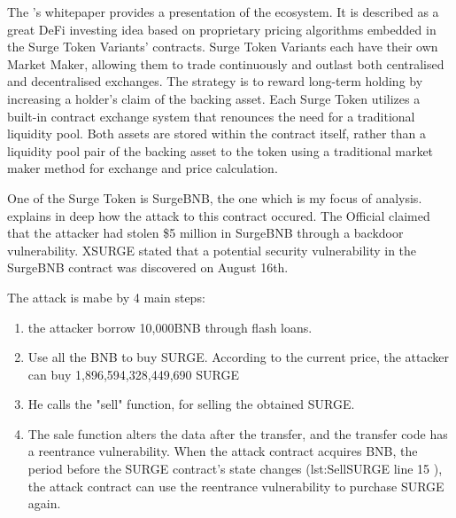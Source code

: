 The \citet{XSurgeWeb}'s whitepaper provides a presentation of the ecosystem.
It is described as a great DeFi investing idea based on proprietary pricing algorithms embedded in the Surge Token Variants' contracts.
Surge Token Variants each have their own Market Maker, allowing them to trade continuously and outlast both 
centralised and decentralised exchanges. 
The strategy is to reward long-term holding by increasing a
holder's claim of the backing asset. Each Surge Token utilizes a built-in contract exchange system that renounces the need for
a traditional liquidity pool. Both assets are stored within the contract itself, 
rather than a liquidity pool pair of the backing asset to the
token using a traditional market maker method for exchange and price calculation.

One of the Surge Token is SurgeBNB, the one which is my focus of analysis.
\citet{XSurgeBNB} explains in deep how the attack to this contract occured. 
The Official claimed that the attacker had stolen \$5 million in SurgeBNB through a backdoor vulnerability.
XSURGE stated that a potential security vulnerability in the SurgeBNB contract was discovered on August 16th.

The attack is mabe by 4 main steps:
\begin{enumerate}
    \item the attacker borrow  10,000BNB through flash loans.
    \item Use all the BNB to buy SURGE. According to the current price, 
    the attacker can buy 1,896,594,328,449,690 SURGE
    \item He calls the "sell" function, for selling the obtained SURGE.
    \item The sale function alters the data after the transfer, and the transfer code has a reentrance vulnerability.
    When the attack contract acquires BNB, the period before the SURGE contract's state changes 
    (\refname{lst:SellSURGE} line 15 ), the attack contract can use the reentrance 
    vulnerability to purchase SURGE again.
\end{enumerate}

